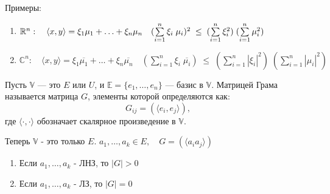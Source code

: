 \begin{shex}
    Примеры:
    \begin{enumerate}
        \item $\mathbb{R}^n: \quad \langle x, y \rangle = \xi_1 \mu_1 + \ldots + \xi_n \mu_n \quad (\sum\limits_{i = 1}^{n} \xi_i \; \mu_i)^2 \; \leq \; (\sum\limits_{i = 1}^{n} \xi_{i}^2) \; (\sum\limits_{i = 1}^{n} \mu_{i}^2)$
        \item $\mathbb{C}^n: \quad \langle x,y \rangle = \xi_{1} \overline{\mu_{1}} + \ldots + \xi_{n} \overline{\mu_{n}} \quad (\sum\limits_{i = 1}^{n} \xi_{i} \; \overline{\mu_{i}}) \; \leq \; (\sum\limits_{i = 1}^{n} |\xi_{i}|^2) \; (\sum\limits_{i = 1}^{n} |\mu_{i}|^2)$
    \end{enumerate}
\end{shex}

\clearpage
\begin{shdef}
\begin{definition}
    \leavevmode \newline
    Пусть $\mathbb{V}$ — это $E$ или $U$, и $\mathbb{E} = \{e_1, \ldots, e_n\}$ — базис в $\mathbb{V}$. \newline
    Матрицей Грама называется матрица $G$, элементы которой определяются как:
    \[
    G_{ij} = (\langle e_i, e_j \rangle),
    \]
    где $\langle \cdot, \cdot \rangle$ обозначает скалярное произведение в $\mathbb{V}$.
\end{definition}
\end{shdef}

\vspace{0.2cm}

\begin{shth}
    \begin{theorem}
        Теперь $\mathbb{V}$ - это только $E$. \newline
        $a_{1}, \ldots, a_{k} \in E, \quad G = (\langle a_{i} a_{j} \rangle)$
        
        \begin{enumerate}
            \item Если ${a_{1}, \ldots, a_{k}}$ - ЛНЗ, то $|G| > 0$
            \item Если ${a_{1}, \ldots, a_{k}}$ - ЛЗ, то $|G| = 0$
        \end{enumerate}
    \end{theorem}
\end{shth}

